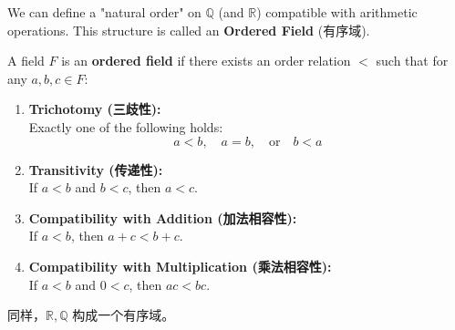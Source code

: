 \documentclass[
	UTF-8,
	11pt, %
	a4paper, %
]{LegrandOrangeBook}
\begin{document}
    We can define a "natural order" on $\mathbb{Q}$ (and $\mathbb{R}$) compatible with arithmetic operations. This structure is called an \textbf{Ordered Field} (有序域).

    \begin{definition}
    A field $F$ is an \textbf{ordered field} if there exists an order relation $<$ such that for any $a, b, c \in F$:

    \begin{enumerate}
        \item \textbf{Trichotomy (三歧性):} \\
        Exactly one of the following holds:
        \[ a < b, \quad a = b, \quad \text{or} \quad b < a \]
        
        \item \textbf{Transitivity (传递性):} \\
        If $a < b$ and $b < c$, then $a < c$.
        
        \item \textbf{Compatibility with Addition (加法相容性):} \\
        If $a < b$, then $a + c < b + c$.
        
        \item \textbf{Compatibility with Multiplication (乘法相容性):} \\
        If $a < b$ and $0 < c$, then $ac < bc$.
    \end{enumerate}
    \end{definition}

    \begin{remark}
        同样，$\mathbb{R}, \mathbb{Q}$ 构成一个有序域。
    \end{remark}
\end{document}
